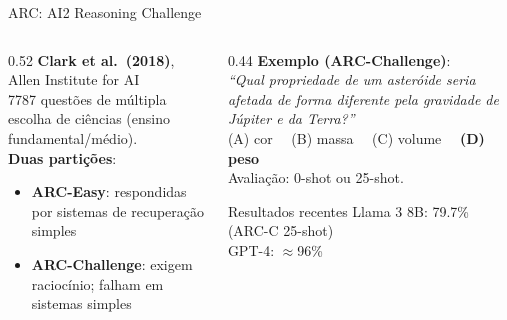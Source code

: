 \documentclass[aspectratio=169, xcolor=dvipsnames]{beamer}
\begin{document}
  \begin{frame}{ARC: AI2 Reasoning Challenge \cite{clark2018arc}}
    \begin{columns}[T]
      \begin{column}{0.52\textwidth}
        \textbf{Clark et al.\ (2018)}, Allen Institute for AI\\[0.4em]
        7787 questões de múltipla escolha de ciências (ensino fundamental/médio).\\[0.4em]
        \textbf{Duas partições}:
        \begin{itemize}
          \item \textbf{ARC-Easy}: respondidas por sistemas de recuperação simples
          \item \textbf{ARC-Challenge}: exigem raciocínio; falham em sistemas simples
        \end{itemize}
      \end{column}
      \begin{column}{0.44\textwidth}
        \textbf{Exemplo (ARC-Challenge)}:\\[0.2em]
        \textit{``Qual propriedade de um asteróide seria afetada de forma diferente pela gravidade de Júpiter e da Terra?''}\\
        (A) cor~~ (B) massa~~ (C) volume~~ \textbf{(D) peso}\\[0.5em]
        Avaliação: 0-shot ou 25-shot.\\[0.3em]
        \begin{exampleblock}{Resultados recentes}
          Llama 3 8B: 79.7\% (ARC-C 25-shot)\\
          GPT-4: $\approx$96\%
        \end{exampleblock}
      \end{column}
    \end{columns}
  \end{frame}
\end{document}
